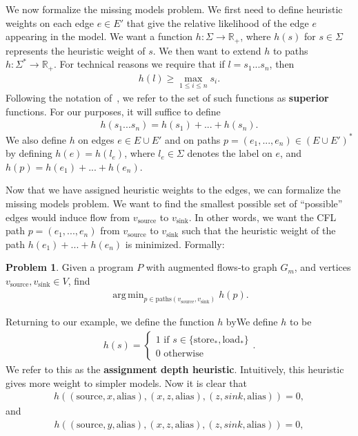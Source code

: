 \documentclass[10pt,twocolumn]{article}
\theoremstyle{definition}
\newtheorem{problem}[theorem]{Problem}
\DeclareMathOperator*{\argmin}{arg\,min}
\begin{document}
\noindent We now formalize the missing models problem. We first need to define heuristic weights on each edge $e\in E'$ that give the relative likelihood of the edge $e$ appearing in the model. We want a function $h:\Sigma\to\mathbb{R}_+$, where $h(s)$ for $s\in\Sigma$ represents the heuristic weight of $s$. We then want to extend $h$ to paths $h:\Sigma^*\to\mathbb{R}_+$. For technical reasons we require that if $l=s_1...s_n$, then
\begin{align*}
h(l)\ge\max_{1\le i\le n}s_i.
\end{align*}
\noindent Following the notation of~\cite{knuth77}, we refer to the set of such functions as {\bf superior} functions. For our purposes, it will suffice to define
\begin{align*}
h(s_1...s_n)=h(s_1)+...+h(s_n).
\end{align*}
\noindent We also define $h$ on edges $e\in E\cup E'$ and on paths $p=(e_1,...,e_n)\in(E\cup E')^*$ by defining $h(e)=h(l_e)$, where $l_e\in\Sigma$ denotes the label on $e$, and $h(p)=h(e_1)+...+h(e_n)$.

Now that we have assigned heuristic weights to the edges, we can formalize the missing models problem. We want to find the smallest possible set of ``possible'' edges would induce flow from $v_{\text{source}}$ to $v_{\text{sink}}$. In other words, we want the CFL path $p=(e_1,...,e_n)$ from $v_{\text{source}}$ to $v_{\text{sink}}$ such that the heuristic weight of the path $h(e_1)+...+h(e_n)$ is minimized. Formally:
\begin{problem}
\label{cflshortestpath}
\noindent Given a program $P$ with augmented flows-to graph $G_m$, and vertices $v_{\text{source}},v_{\text{sink}}\in V$, find
\begin{align*}
\argmin_{p\in\text{paths}(v_{\text{source}},v_{\text{sink}})}h(p).
\end{align*}
\end{problem}

\noindent Returning to our example, we define the function $h$ by\noindent We define $h$ to be
\begin{align*}
h(s)=
\begin{cases}
1\text{ if }s\in\{\text{store}_*,\text{load}_*\}\\
0\text{ otherwise}
\end{cases}.
\end{align*}
\noindent We refer to this as the {\bf assignment depth heuristic}. Intuitively, this heuristic gives more weight to simpler models. Now it is clear that
\begin{align*}
h\left((\text{source},x,\text{alias}),(x,z,\text{alias}),(z,sink,\text{alias})\right)=0,
\end{align*}
and
\begin{align*}
h\left((\text{source},y,\text{alias}),(x,z,\text{alias}),(z,sink,\text{alias})\right)=0,
\end{align*}
\end{document}
